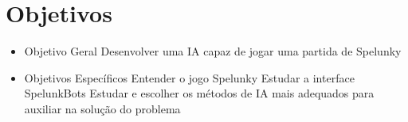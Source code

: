 \chapter{\label{chap:objectives}Objetivos}

\begin{itemize}
    \item Objetivo Geral
        \subitem Desenvolver uma IA capaz de jogar uma partida de Spelunky
    \item Objetivos Específicos
        \subitem Entender o jogo Spelunky
        \subitem Estudar a interface SpelunkBots
        \subitem Estudar e escolher os métodos de IA mais adequados para auxiliar na solução do problema
\end{itemize}
